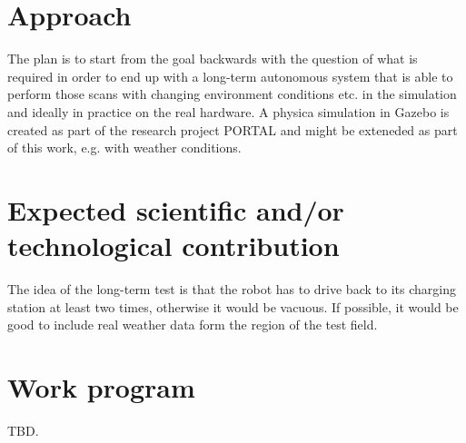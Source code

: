 \documentclass[german, master, expose, latin1]{base/thesis_KBS}
\begin{document}
\section{Approach}

The plan is to start from the goal backwards with the question of what is required in order to end up with a long-term autonomous system that is
able to perform those scans with changing environment conditions etc. in the simulation and ideally in practice on the real hardware.
A physica simulation in Gazebo is created as part of the research project PORTAL and might be exteneded as part of this work, e.g. with weather conditions.

\section{Expected scientific and/or technological contribution}

The idea of the long-term test is that the robot has to drive back to its charging station at least two times, otherwise it would be vacuous.
If possible, it would be good to include real weather data form the region of the test field.

\section{Work program}

TBD.


\end{document}
